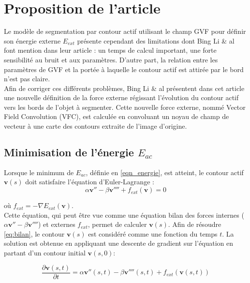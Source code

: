\section{Proposition de l'article}

Le modèle de segmentation par contour actif utilisant le champ GVF pour définir son énergie externe $E_{ext}$ présente cependant des limitations dont Bing Li \& al font mention dans leur article : un temps de calcul important, une forte sensibilité au bruit et aux paramètres. D'autre part, la relation entre les paramètres de GVF et la portée à laquelle le contour actif est attirée par le bord n'est pas claire.\\

Afin de corriger ces différents problèmes, Bing Li \& al présentent dans cet article une nouvelle définition de la force externe régissant l'évolution du contour actif vers les bords  de l'objet à segmenter. Cette nouvelle force externe, nommé Vector Field Convolution (VFC), est calculée en convoluant un noyau de champ de vecteur à une carte des contours extraite de l'image d'origine.   

\subsection{Minimisation de l'énergie $E_{ac}$}

Lorsque le minimum de $E_{ac}$, définie en \ref{eqn_energie}, est atteint, le contour actif $\mathbf{v}(s)$ doit satisfaire l'équation d'Euler-Lagrange :
\begin{equation}
	\alpha \mathbf{v}'' - \beta \mathbf{v}'''' + f_{ext}(\mathbf{v}) = 0
	\label{eq:bilan}
\end{equation}

où $f_{ext}= - \nabla E_{ext}(\mathbf{v})$. \\

Cette équation, qui peut être vue comme une équation bilan des forces internes ($\alpha \mathbf{v}'' - \beta \mathbf{v}''''$) et externes $f_{ext}$, permet de calculer $\mathbf{v}(s)$. Afin de résoudre \ref{eq:bilan}, le contour $\mathbf{v}(s)$ est considéré comme une fonction du temps $t$. La solution est obtenue en appliquant une descente de gradient sur l'équation en partant d'un contour initial $\mathbf{v}(s,0)$:

\begin{equation}
	\frac{\partial \mathbf{v}(s,t)}{\partial t} = \alpha \mathbf{v}''(s,t) - \beta \mathbf{v}''''(s,t)+f_{ext}(\mathbf{v}(s,t))
	\label{eq:graddesc}
\end{equation}

